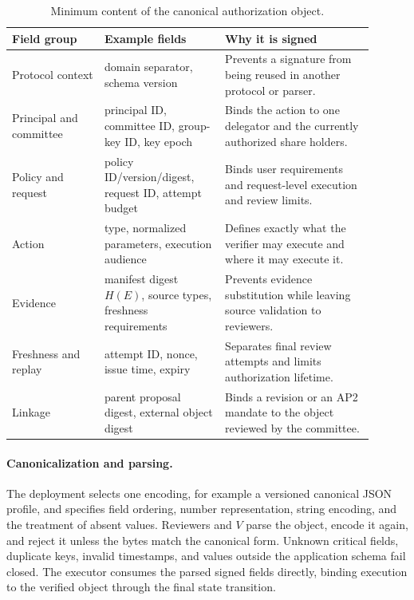 \documentclass{article}
\begin{document}
\begin{table}[ht]
\centering
\small
\setlength{\tabcolsep}{4pt}
\begin{tabular}{L{0.23\linewidth}L{0.30\linewidth}L{0.37\linewidth}}
\toprule
Field group & Example fields & Why it is signed \\
\midrule
Protocol context & domain separator, schema version & Prevents a signature from being reused in another protocol or parser. \\
Principal and committee & principal ID, committee ID, group-key ID, key epoch & Binds the action to one delegator and the currently authorized share holders. \\
Policy and request & policy ID/version/digest, request ID, attempt budget & Binds user requirements and request-level execution and review limits. \\
Action & type, normalized parameters, execution audience & Defines exactly what the verifier may execute and where it may execute it. \\
Evidence & manifest digest $H(E)$, source types, freshness requirements & Prevents evidence substitution while leaving source validation to reviewers. \\
Freshness and replay & attempt ID, nonce, issue time, expiry & Separates final review attempts and limits authorization lifetime. \\
Linkage & parent proposal digest, external object digest & Binds a revision or an AP2 mandate to the object reviewed by the committee. \\
\bottomrule
\end{tabular}
\caption{Minimum content of the canonical authorization object.}
\label{tab:message}
\end{table}

\paragraph{Canonicalization and parsing.}
The deployment selects one encoding, for example a versioned canonical JSON
profile, and specifies field ordering, number representation, string encoding,
and the treatment of absent values. Reviewers and $V$ parse the object, encode it
again, and reject it unless the bytes match the canonical form. Unknown critical
fields, duplicate keys, invalid timestamps, and values outside the application
schema fail closed. The executor consumes the parsed signed fields directly,
binding execution to the verified object through the final state transition.
\end{document}
